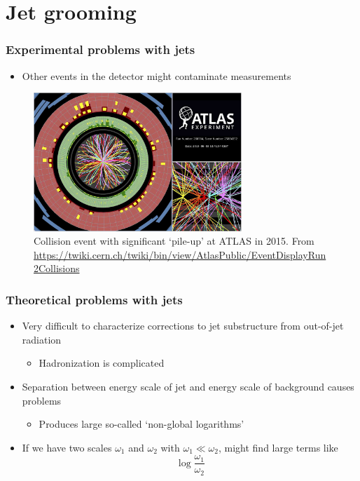 \documentclass{beamer}
\begin{document}
\section{Jet grooming}
	\begin{frame}
		\frametitle{Experimental problems with jets}

		\begin{itemize}
			\item Other events in the detector might contaminate measurements
		\end{itemize}

		\vfill

		\begin{figure}
			\includegraphics[width=0.7\textwidth]{figures/atlas_pile_up.jpeg}
			\caption{Collision event with significant `pile-up' at ATLAS in 2015. From \url{https://twiki.cern.ch/twiki/bin/view/AtlasPublic/EventDisplayRun2Collisions}}
		\end{figure}
	\end{frame}

	\begin{frame}
		\frametitle{Theoretical problems with jets}

		\begin{itemize}
			\item Very difficult to characterize corrections to jet substructure from out-of-jet radiation
			\begin{itemize}
				\item Hadronization is complicated
			\end{itemize}

			\item Separation between energy scale of jet and energy scale of background causes problems
			\begin{itemize}
				\item Produces large so-called `non-global logarithms' \cite{kardos_groomed_2020}
			\end{itemize}

			\item If we have two scales $\omega_1$ and $\omega_2$ with $\omega_1 \ll \omega_2$, might find large terms like
			\begin{equation*}
				\log \frac{\omega_1}{\omega_2}
			\end{equation*}
		\end{itemize}
	\end{frame}
\end{document}
